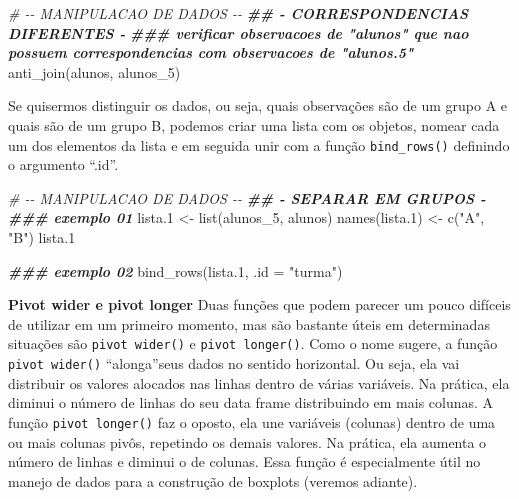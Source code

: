 \documentclass[
]{book}
\newenvironment{Shaded}{\begin{snugshade}}{\end{snugshade}}
\newcommand{\AttributeTok}[1]{\textcolor[rgb]{0.77,0.63,0.00}{#1}}
\newcommand{\CommentTok}[1]{\textcolor[rgb]{0.56,0.35,0.01}{\textit{#1}}}
\newcommand{\DocumentationTok}[1]{\textcolor[rgb]{0.56,0.35,0.01}{\textbf{\textit{#1}}}}
\newcommand{\FloatTok}[1]{\textcolor[rgb]{0.00,0.00,0.81}{#1}}
\newcommand{\FunctionTok}[1]{\textcolor[rgb]{0.00,0.00,0.00}{#1}}
\newcommand{\NormalTok}[1]{#1}
\newcommand{\OtherTok}[1]{\textcolor[rgb]{0.56,0.35,0.01}{#1}}
\newcommand{\StringTok}[1]{\textcolor[rgb]{0.31,0.60,0.02}{#1}}
\begin{document}
\begin{Shaded}
\begin{Highlighting}[]
\CommentTok{\# {-}{-} MANIPULACAO DE DADOS {-}{-}}
\DocumentationTok{\#\# {-} CORRESPONDENCIAS DIFERENTES {-}}
\DocumentationTok{\#\#\# verificar observacoes de "alunos" que nao possuem correspondencias com observacoes de "alunos.5"}
\FunctionTok{anti\_join}\NormalTok{(alunos, alunos\_5)}
\end{Highlighting}
\end{Shaded}

Se quisermos distinguir os dados, ou seja, quais observações são de um grupo A e quais são de um grupo B, podemos criar uma lista com os objetos, nomear cada um dos elementos da lista e em seguida unir com a função \texttt{bind\_rows()} definindo o argumento ``.id''.

\begin{Shaded}
\begin{Highlighting}[]
\CommentTok{\# {-}{-} MANIPULACAO DE DADOS {-}{-}}
\DocumentationTok{\#\# {-} SEPARAR EM GRUPOS {-}}
\DocumentationTok{\#\#\# exemplo 01}
\NormalTok{lista}\FloatTok{.1} \OtherTok{\textless{}{-}} \FunctionTok{list}\NormalTok{(alunos\_5, alunos)}
\FunctionTok{names}\NormalTok{(lista}\FloatTok{.1}\NormalTok{) }\OtherTok{\textless{}{-}} \FunctionTok{c}\NormalTok{(}\StringTok{"A"}\NormalTok{, }\StringTok{"B"}\NormalTok{)}
\NormalTok{lista}\FloatTok{.1}

\DocumentationTok{\#\#\# exemplo 02}
\FunctionTok{bind\_rows}\NormalTok{(lista}\FloatTok{.1}\NormalTok{, }\AttributeTok{.id =} \StringTok{"turma"}\NormalTok{)}
\end{Highlighting}
\end{Shaded}

\textbf{Pivot wider e pivot longer}
Duas funções que podem parecer um pouco difíceis de utilizar em um primeiro momento, mas são bastante úteis em determinadas situações são \texttt{pivot\ wider()} e \texttt{pivot\ longer()}. Como o nome sugere, a função \texttt{pivot\ wider()} ``alonga''seus dados no sentido horizontal. Ou seja, ela vai distribuir os valores alocados nas linhas dentro de várias variáveis. Na prática, ela diminui o número de linhas do seu data frame distribuindo em mais colunas. A função \texttt{pivot\ longer()} faz o oposto, ela une variáveis (colunas) dentro de uma ou mais colunas pivôs, repetindo os demais valores. Na prática, ela aumenta o número de linhas e diminui o de colunas. Essa função é especialmente útil no manejo de dados para a construção de boxplots (veremos adiante).
\end{document}
